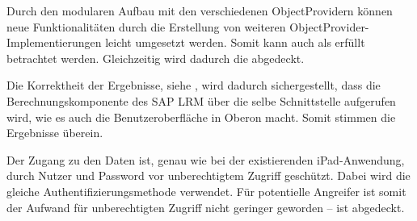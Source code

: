 \begin{onehalfspacing}

Durch den modularen Aufbau mit den verschiedenen ObjectProvidern können neue Funktionalitäten durch die Erstellung von weiteren ObjectProvider-Implementierungen leicht umgesetzt werden. Somit kann auch  als erfüllt betrachtet werden. Gleichzeitig wird dadurch die  abgedeckt.

Die Korrektheit der Ergebnisse, siehe , wird dadurch sichergestellt, dass die Berechnungskomponente des SAP LRM über die selbe Schnittstelle aufgerufen wird, wie es auch die Benutzeroberfläche in Oberon macht. Somit stimmen die Ergebnisse überein.

Der Zugang zu den Daten ist, genau wie bei der existierenden iPad-Anwendung, durch Nutzer und Password vor unberechtigtem Zugriff geschützt. Dabei wird die gleiche Authentifizierungsmethode verwendet. Für potentielle Angreifer ist somit der Aufwand für unberechtigten Zugriff nicht geringer geworden --  ist abgedeckt.


\end{onehalfspacing}
